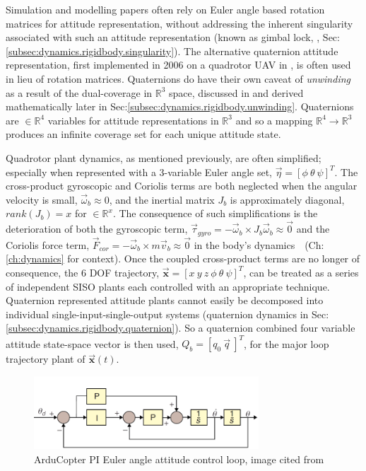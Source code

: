 Simulation and modelling papers often rely on Euler angle based rotation matrices for attitude representation, \cite{adaptivedisturbancecontrol, optimizedpidquadcopter, singleaxistilting, backsteppingquadcoptercontrol, fullquadcoptercontrol} without addressing the inherent singularity associated with such an attitude representation (known as gimbal lock, \cite{euleranglesingularity}, Sec:\ref{subsec:dynamics.rigidbody.singularity}). The alternative quaternion attitude representation, first implemented in 2006 on a quadrotor UAV in \cite{attitudestabilization}, is often used in lieu of rotation matrices. Quaternions do have their own caveat of \emph{unwinding} as a result of the dual-coverage in $\mathbb{R}^3$ space, discussed in \cite{unwinding} and derived mathematically later in Sec:\ref{subsec:dynamics.rigidbody.unwinding}. Quaternions are $\in\mathbb{R}^4$ variables for attitude representations in $\mathbb{R}^3$ and so a mapping $\mathbb{R}^4\rightarrow\mathbb{R}^3$ produces an infinite coverage set for each unique attitude state.
\par
Quadrotor plant dynamics, as mentioned previously, are often simplified; especially when represented with a 3-variable Euler angle set, $\vec{\eta} = [\phi ~\theta ~\psi]^T$. The cross-product gyroscopic and Coriolis terms are both neglected when the angular velocity is small, $\vec{\omega}_b \approx 0$, and the inertial matrix $J_b$ is approximately diagonal, $rank(J_b)= x$ for $\in\mathbb{R}^x$. The consequence of such simplifications is the deterioration of both the gyroscopic term, $\vec{\tau}_{gyro}=-\vec{\omega}_b \times J_b\vec{\omega}_b \approx \vec{0}$ and the  Coriolis force term, $\vec{F}_{cor}=-\vec{\omega}_b \times m\vec{v}_b \approx \vec{0}$ in the body's dynamics~~(Ch:\ref{ch:dynamics} for context). Once the coupled cross-product terms are no longer of consequence, the 6 DOF trajectory, $\vec{\mathbf{x}}=[x ~y ~z ~\phi ~\theta ~\psi]^T$, can be treated as a series of independent SISO plants each controlled with an appropriate technique. Quaternion represented attitude plants cannot easily be decomposed into individual single-input-single-output systems (quaternion dynamics in Sec:\ref{subsec:dynamics.rigidbody.quaternion}). So a quaternion combined four variable attitude state-space vector is then used, $Q_b = [q_0 ~\vec{q}\>]^T$, for the major loop trajectory plant of $\vec{\mathbf{x}}(t)$.
\par
\begin{figure}[hbtp]
\centering
\includegraphics[width=0.75\textwidth]{figs/arducopter-pi}
\caption{ArduCopter PI Euler angle attitude control loop, image cited from~\cite{buildyourownquad}}
\label{fig:arducopter-pi}
\end{figure}
